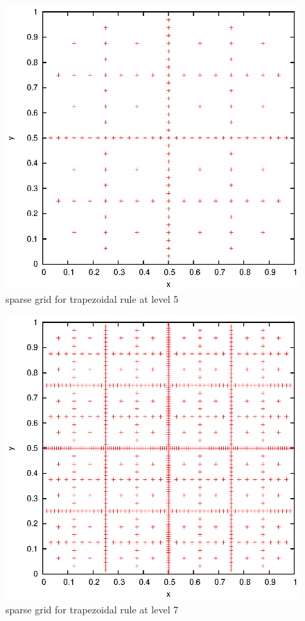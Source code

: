 \documentclass[]{article}
\begin{document}
\begin{figure}[!ht]
\centering
\includegraphics[width=.9\textwidth]{task11_trap_5}
\caption{sparse grid for trapezoidal rule at level 5}
\label{fig:Task11c}
\end{figure}

\begin{figure}[!ht]
\centering
\includegraphics[width=.9\textwidth]{task11_trap_7}
\caption{sparse grid for trapezoidal rule at level 7}
\label{fig:Task11d}
\end{figure}
\clearpage
\end{document}
